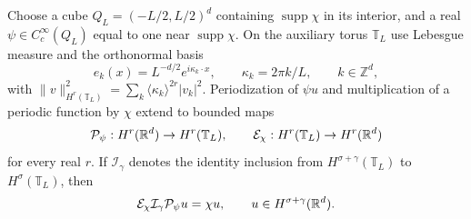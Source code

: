 \begin{lemma}\label{L:cutoff-factorization}
  Choose a cube $Q_L=(-L/2,L/2)^d$ containing $\operatorname{supp}\chi$
  in its interior, and a real $\psi \in C_c^\infty(Q_L)$ equal to one
  near $\operatorname{supp}\chi$. On the auxiliary torus $\mathbb T_L$ use
  Lebesgue measure and the orthonormal basis
  \[
    e_k(x)=L^{-d/2}e^{i\kappa_k\cdot x},\qquad
    \kappa_k=2\pi k/L,\qquad k \in \mathbb Z^d,
  \]
  with $\|v\|_{H^r(\mathbb T_L)}^2
  =\sum_k\langle\kappa_k\rangle^{2r}|v_k|^2$. Periodization of $\psi u$
  and multiplication of a periodic function by $\chi$ extend to bounded maps
  \begin{equation}\label{E:cutoff-periodic-maps}
    \mathcal P_\psi:H^r(\mathbb{R}^d)\to H^r(\mathbb T_L),\qquad
    \mathcal E_\chi:H^r(\mathbb T_L)\to H^r(\mathbb{R}^d)
  \end{equation}
  for every real $r$. If $\mathcal I_\gamma$ denotes the identity inclusion
  from $H^{\sigma+\gamma}(\mathbb T_L)$ to $H^\sigma(\mathbb T_L)$, then
  \begin{equation}\label{E:cutoff-whole-space-recovery}
    \mathcal E_\chi\mathcal I_\gamma\mathcal P_\psi u=\chi u,
    \qquad u \in H^{\sigma+\gamma}(\mathbb{R}^d).
  \end{equation}
\end{lemma}

